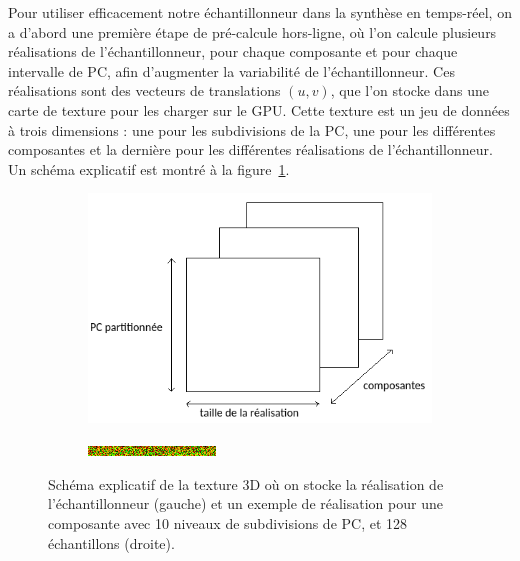 \bigskip

Pour utiliser efficacement notre échantillonneur dans la synthèse en temps-réel, on a d'abord une première étape de pré-calcule hors-ligne, où l'on calcule plusieurs réalisations de l'échantillonneur, pour chaque composante et pour chaque intervalle de PC, afin d'augmenter la variabilité de l'échantillonneur. Ces réalisations sont des vecteurs de translations $(u, v)$, que l'on stocke dans une carte de texture pour les charger sur le GPU. Cette texture est un jeu de données à trois dimensions : une pour les subdivisions de la PC, une pour les différentes composantes et la dernière pour les différentes réalisations de l'échantillonneur. Un schéma explicatif est montré à la figure~\ref{fig:sampler-realization}.

\begin{figure}
    \centering
    \begin{subfigure}{.5\textwidth}
        \centering
        \includegraphics[width=\textwidth]{contenu/resources/images/sampler_realization}
    \end{subfigure}
    \hfill
    \begin{subfigure}{.45\textwidth}
        \centering
        \includegraphics[width=\textwidth]{contenu/resources/images/realization_pc_0}
    \end{subfigure}

    \caption[Réalisation de l'échantillonneur préférentiel]{Schéma explicatif de la texture 3D où on stocke la réalisation de l'échantillonneur (gauche) et un exemple de réalisation pour une composante avec 10 niveaux de subdivisions de PC, et 128 échantillons (droite).}
    \label{fig:sampler-realization}
\end{figure}

